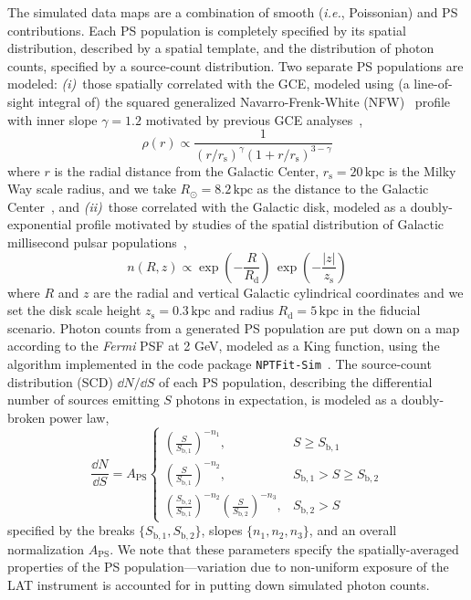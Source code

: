 \documentclass[prd,aps,10pt,nofootinbib,twocolumn,superscriptaddress,preprintnumbers,balancelastpage,longbibliography]{revtex4-1}
\begin{document}
The simulated data maps are a combination of smooth (\emph{i.e.}, Poissonian) and PS contributions. Each PS population is completely specified by its spatial distribution, described by a spatial template, and the distribution of photon counts, specified by a source-count distribution. Two separate PS populations are modeled: \emph{(i)}~those spatially correlated with the GCE, modeled using (a line-of-sight integral of) the squared generalized Navarro-Frenk-White (NFW)~\cite{Navarro:1995iw,Navarro:1996gj} profile with inner slope $\gamma=1.2$ motivated by previous GCE analyses~\cite{Gordon:2013vta,Daylan:2014rsa,Zhou:2014lva},
\begin{equation}
\label{eq:nfw}
\rho(r) \propto \frac{1}{\left(r / r_{\mathrm s}\right)^{\gamma}\left(1+r / r_{\mathrm s}\right)^{3-\gamma}}
\end{equation}
where $r$ is the radial distance from the Galactic Center, $r_{\mathrm s}=20\,\mathrm{kpc}$ is the Milky Way scale radius, and we take $R_\odot = 8.2\,\mathrm{kpc}$ as the distance to the Galactic Center~\cite{2020arXiv201202169B,2019A&A...625L..10G}, and \emph{(ii)}~those correlated with the Galactic disk, modeled as a doubly-exponential profile motivated by studies of the spatial distribution of Galactic millisecond pulsar populations~\cite{Lorimer:2006qs, Bartels:2018xom},
\begin{equation}
\label{eq:disk_spatial}
n(R, z) \propto \exp \left(-\frac{R}{R_\mathrm{d}}\right) \, \exp\left(-\frac{|z|}{z_\mathrm{s}}\right)
\end{equation}
where $R$ and $z$ are the radial and vertical Galactic cylindrical coordinates and we set the disk scale height $z_\mathrm{s} = 0.3\,\mathrm{kpc}$ and radius $R_\mathrm{d} = 5\,\mathrm{kpc}$ in the fiducial scenario.  %
Photon counts from a generated PS population are put down on a map according to the \emph{Fermi} PSF at 2 GeV, modeled as a King function, using the algorithm implemented in the code package \texttt{NPTFit-Sim}~\cite{NPTFit-Sim}. The source-count distribution (SCD) $\dd N /\dd S$ of each PS population, describing the differential number of sources emitting $S$ photons in expectation, is modeled as a doubly-broken power law,
\begin{equation}
\label{eq:scd_bpl}
\frac{\dd N}{\dd S}=A_\mathrm{PS}\left\{\begin{array}{lc}
\left(\frac{S}{S_{\mathrm b, 1}}\right)^{-n_{1}}, & S \geq S_{\mathrm b, 1} \\
\left(\frac{S}{S_{\mathrm b, 1}}\right)^{-n_{2}}, & S_{\mathrm b, 1}>S \geq S_{\mathrm b, 2} \\
\left(\frac{S_{\mathrm b, 2}}{S_{\mathrm b, 1}}\right)^{-n_{2}}\left(\frac{S}{S_{\mathrm b, 2}}\right)^{-n_{3}}, & S_{\mathrm b, 2}>S
\end{array}\right.
\end{equation}
specified by the breaks $\{S_{\mathrm b, 1}, S_{\mathrm b, 2}\}$, slopes $\{n_1, n_2, n_3\}$, and an overall normalization $A_\mathrm{PS}$. We note that these parameters specify the {spatially-averaged} properties of the PS population---variation due to non-uniform exposure of the LAT instrument is accounted for in putting down simulated photon counts.
\end{document}
